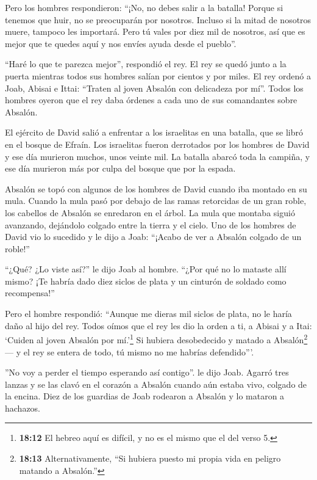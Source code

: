  Pero los hombres respondieron: ``¡No, no debes salir a la
batalla! Porque si tenemos que huir, no se preocuparán por nosotros.
Incluso si la mitad de nosotros muere, tampoco les importará. Pero tú
vales por diez mil de nosotros, así que es mejor que te quedes aquí y
nos envíes ayuda desde el pueblo''.

 ``Haré lo que te parezca mejor'', respondió el rey. El rey
se quedó junto a la puerta mientras todos sus hombres salían por cientos
y por miles.  El rey ordenó a Joab, Abisai e Ittai: ``Traten
al joven Absalón con delicadeza por mí''. Todos los hombres oyeron que
el rey daba órdenes a cada uno de sus comandantes sobre Absalón.

 El ejército de David salió a enfrentar a los israelitas en
una batalla, que se libró en el bosque de Efraín.  Los
israelitas fueron derrotados por los hombres de David y ese día murieron
muchos, unos veinte mil.  La batalla abarcó toda la campiña,
y ese día murieron más por culpa del bosque que por la espada.

 Absalón se topó con algunos de los hombres de David cuando
iba montado en su mula. Cuando la mula pasó por debajo de las ramas
retorcidas de un gran roble, los cabellos de Absalón se enredaron en el
árbol. La mula que montaba siguió avanzando, dejándolo colgado entre la
tierra y el cielo.  Uno de los hombres de David vio lo
sucedido y le dijo a Joab: ``¡Acabo de ver a Absalón colgado de un
roble!''

 ``¿Qué? ¿Lo viste así?'' le dijo Joab al hombre. ``¿Por
qué no lo mataste allí mismo? ¡Te habría dado diez siclos de plata y un
cinturón de soldado como recompensa!''

 Pero el hombre respondió: ``Aunque me dieras mil siclos de
plata, no le haría daño al hijo del rey. Todos oímos que el rey les dio
la orden a ti, a Abisai y a Itai: `Cuiden al joven Absalón por
mí.'\footnote{\textbf{18:12} El hebreo aquí es difícil, y no es el mismo
  que el del verso 5.}  Si hubiera desobedecido y matado a
Absalón\footnote{\textbf{18:13} Alternativamente, ``Si hubiera puesto mi
  propia vida en peligro matando a Absalón.''}--- y el rey se entera de
todo, tú mismo no me habrías defendido'''.

 ''No voy a perder el tiempo esperando así contigo''. le
dijo Joab. Agarró tres lanzas y se las clavó en el corazón a Absalón
cuando aún estaba vivo, colgado de la encina.  Diez de los
guardias de Joab rodearon a Absalón y lo mataron a hachazos.

